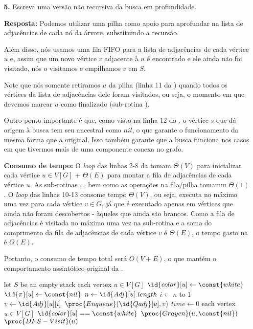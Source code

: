 
\noindent\textbf{5.} Escreva uma versão não recursiva da busca em profundidade.

\textbf{Resposta:} Podemos utilizar uma pilha como apoio para aprofundar na lista de adjacências de cada nó da árvore, substituindo a recursão.

Além disso, nós usamos uma fila FIFO para a lista de adjacências de cada vértice $u$ e, assim que um novo vértice $v$ adjacente à $u$ é encontrado e ele ainda não foi visitado, nós o visitamos e empilhamos $v$ em $S$.

Note que nós somente retiramos $u$ da pilha (linha 11 da ) quando todos os vértices da lista de adjacências dele foram visitados, ou seja, o momento em que devemos marcar $u$ como finalizado (sub-rotina ).

Outro ponto importante é que, como visto na linha 12 da , o vértice $s$ que dá origem à busca tem seu ancestral como $nil$, o que garante o funcionamento da mesma forma que a  original. Isso também garante que a busca funciona nos casos em que tivermos mais de uma componente conexa no grafo.

\textbf{Consumo de tempo:} O \textit{loop} das linhas 2-8 da  tomam $\Theta(V)$ para inicializar cada vértice $u \in V[G]$ + $\Theta(E)$ para montar a fila de adjacências de cada vértice $u$. As sub-rotinas , , bem como as operações na fila/pilha tomamm $\Theta(1)$. O \textit{loop} das linhas 10-13 consome tempo $\Theta(V)$, ou seja, executa no máximo uma vez para cada vértice $v \in G$, já que  é executado apenas em vértices que ainda não foram descobertos - àqueles que ainda são brancos. Como a fila de adjacências é visitada no máximo uma vez na sub-rotina  e a soma do comprimento da fila de adjacências de cada vértice $v$ é $\Theta(E)$, o tempo gasto na  é $O(E)$.

Portanto, o consumo de tempo total será $O(V + E)$, o que mantém o comportamento assintótico original da .

\begin{codebox}
\li \Comment let $S$ be an empty stack
\li \For each vertex $u \in V[G]$
\li \Do
        $\id{color}[u] \gets \const{white}$
\li     $\id{\pi}[u] \gets \const{nil}$
\li     $n \gets \id{Adj}[u].length$
\li     \For $i \gets n$ to $1$
\li     \Do
            $v \gets \id{Adj}[u][i]$
\li         $\proc{Enqueue}(\id{Qadj}[u], v)$
        \End
    \End
\li $time \gets 0$
\li \For each vertex $u \in V[G]$
\li \Do
        \If $\id{color}[u] == \const{white}$
\li     \Then 
            $\proc{Grayen}(u, \const{nil})$
\li         $\proc{DFS-Visit}(u)$
    \End
\end{codebox}

